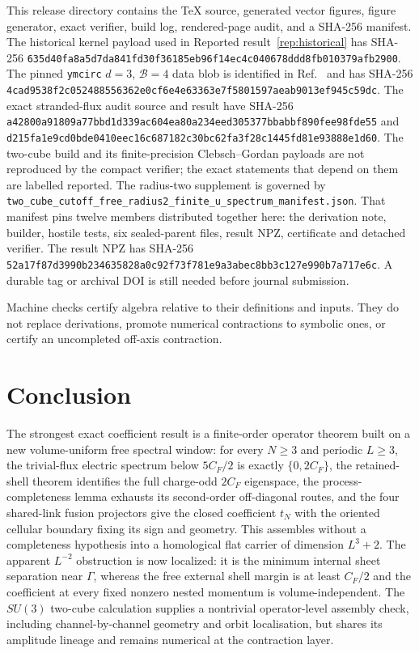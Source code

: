 \documentclass[11pt]{article}
\theoremstyle{plain}
\theoremstyle{definition}
\theoremstyle{remark}
\begin{document}
This release directory contains the TeX source, generated vector figures,
figure generator, exact verifier, build log, rendered-page audit, and a
SHA-256 manifest. The historical kernel payload used in
Reported result~\ref{rep:historical} has SHA-256
\nolinkurl{635d40fa8a5d7da841fd30f36185eb96f14ec4c040678ddd8fb010379afb2900}.
The pinned \texttt{ymcirc} $d=3$, $\mathcal B=4$ data blob is identified in
Ref.~\cite{ymcirc2026} and has SHA-256
\nolinkurl{4cad9538f2c052488556362e0cf6e4e63363e7f5801597aeab9013ef945c59dc}.
The exact stranded-flux audit source and result have SHA-256
\nolinkurl{a42800a91809a77bbd1d339ac604ea80a234eed305377bbabbf890fee98fde55}
and
\nolinkurl{d215fa1e9cd0bde0410eec16c687182c30bc62fa3f28c1445fd81e93888e1d60}.
The two-cube build and its finite-precision Clebsch--Gordan payloads are not
reproduced by the compact verifier; the exact statements that depend on them
are labelled reported. The radius-two supplement is governed by
\texttt{two\_cube\_cutoff\_free\_radius2\_finite\_u\_spectrum\_manifest.json}.
That manifest pins twelve members distributed together here: the derivation
note, builder, hostile tests, six sealed-parent files, result NPZ, certificate
and detached verifier. The result NPZ has SHA-256
\nolinkurl{52a17f87d3990b234635828a0c92f73f781e9a3abec8bb3c127e990b7a717e6c}.
A durable tag or archival DOI is still needed before journal submission.

Machine checks certify algebra relative to their definitions and inputs. They
do not replace derivations, promote numerical contractions to symbolic ones,
or certify an uncompleted off-axis contraction.

\section{Conclusion}

The strongest exact coefficient result is a finite-order operator theorem built
on a new volume-uniform free spectral window: for every $N\ge3$ and periodic $L\ge3$,
the trivial-flux electric spectrum below $5C_F/2$ is exactly $\{0,2C_F\}$,
the retained-shell theorem identifies the full charge-odd $2C_F$ eigenspace,
the process-completeness lemma exhausts its second-order off-diagonal routes,
and the four shared-link fusion projectors give the closed coefficient $t_N$
with the oriented cellular boundary fixing its sign and geometry. This
assembles without a completeness hypothesis into a homological flat carrier
of dimension $L^3+2$. The apparent $L^{-2}$ obstruction is now localized:
it is the minimum internal sheet separation near $\Gamma$, whereas the free
external shell margin is at least $C_F/2$ and the coefficient at every fixed
nonzero nested momentum is volume-independent. The $SU(3)$
two-cube calculation supplies a
nontrivial operator-level assembly check, including channel-by-channel
geometry and orbit localisation, but shares its amplitude lineage and remains
numerical at the contraction layer.
\end{document}
